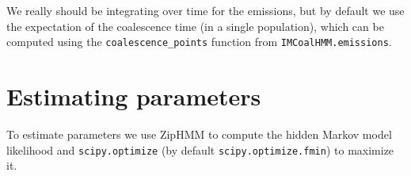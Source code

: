 \documentclass[11pt]{article}
\begin{document}
We really should be integrating over time for the emissions, but by default we use the expectation of the coalescence time (in a single population), which can be computed using the \texttt{coalescence\_points} function from \texttt{IMCoalHMM.emissions}.


\section{Estimating parameters}

To estimate parameters we use ZipHMM \cite{Sand:2013bi} to compute the hidden Markov model likelihood and \texttt{scipy.optimize} (by default \texttt{scipy.optimize.fmin}) to maximize it.




\end{document}
